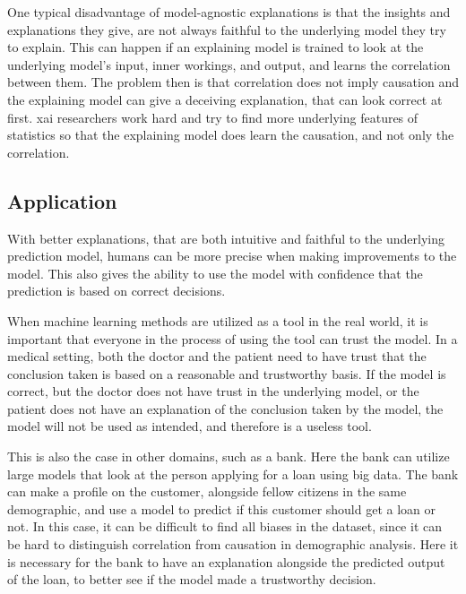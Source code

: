 One typical disadvantage of model-agnostic explanations is that the insights and explanations they give, are not always faithful to the underlying model they try to explain. This can happen if an explaining model is trained to look at the underlying model's input, inner workings, and output, and learns the correlation between them. The problem then is that correlation does not imply causation and the explaining model can give a deceiving explanation, that can look correct at first. \gls{xai} researchers work hard and try to find more underlying features of statistics so that the explaining model does learn the causation, and not only the correlation.




\subsection{Application}

With better explanations, that are both intuitive and faithful to the underlying prediction model, humans can be more precise when making improvements to the model. This also gives the ability to use the model with confidence that the prediction is based on correct decisions.


When machine learning methods are utilized as a tool in the real world, it is important that everyone in the process of using the tool can trust the model. 
In a medical setting, both the doctor and the patient need to have trust that the conclusion taken is based on a reasonable and trustworthy basis. If the model is correct, but the doctor does not have trust in the underlying model, or the patient does not have an explanation of the conclusion taken by the model, the model will not be used as intended, and therefore is a useless tool. 

This is also the case in other domains, such as a bank. Here the bank can utilize large models that look at the person applying for a loan using big data. The bank can make a profile on the customer, alongside fellow citizens in the same demographic, and use a model to predict if this customer should get a loan or not. In this case, it can be difficult to find all biases in the dataset, since it can be hard to distinguish correlation from causation in demographic analysis. Here it is necessary for the bank to have an explanation alongside the predicted output of the loan, to better see if the model made a trustworthy decision. 

